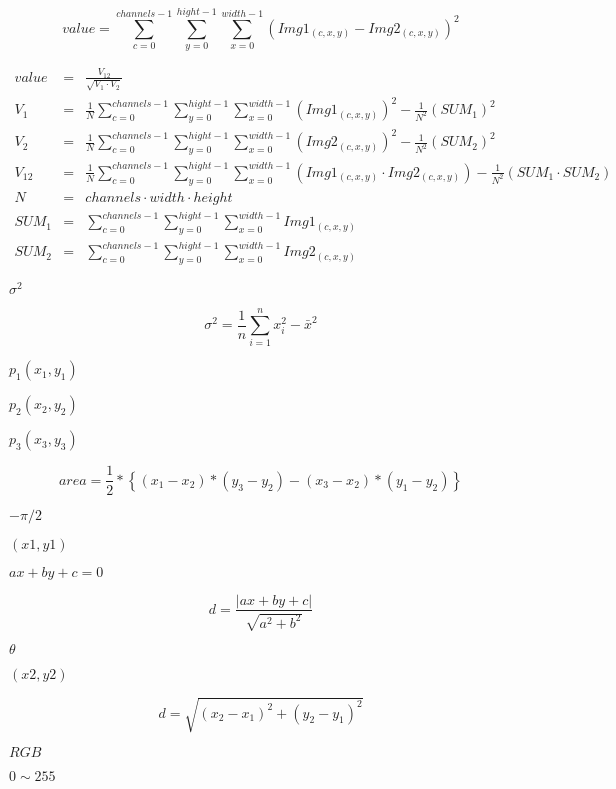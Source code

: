 \documentclass{article}
\begin{document}
\[ value = \sum_{c=0}^{channels-1}\sum_{y=0}^{hight-1}\sum_{x=0}^{width-1}( Img1_{(c,x,y)} - Img2_{(c,x,y)} )^2 \]
\pagebreak

\begin{eqnarray*} value &=& \frac{ V_{12} }{ \sqrt{ V_{1} \cdot V_{2} } }\\ V_{1} &=& \frac{1}{N}\sum_{c=0}^{channels-1}\sum_{y=0}^{hight-1}\sum_{x=0}^{width-1}( Img1_{(c,x,y)} )^2 - \frac{1}{N^2} \left( SUM_{1} \right)^2\\ V_{2} &=& \frac{1}{N}\sum_{c=0}^{channels-1}\sum_{y=0}^{hight-1}\sum_{x=0}^{width-1}( Img2_{(c,x,y)} )^2 - \frac{1}{N^2} \left( SUM_{2} \right)^2\\ V_{12} &=& \frac{1}{N}\sum_{c=0}^{channels-1}\sum_{y=0}^{hight-1}\sum_{x=0}^{width-1}( Img1_{(c,x,y)} \cdot Img2_{(c,x,y)} ) - \frac{1}{N^2} \left( SUM_{1} \cdot SUM_{2} \right)\\ N &=& channels \cdot width \cdot height\\ SUM_{1} &=& \sum_{c=0}^{channels-1}\sum_{y=0}^{hight-1}\sum_{x=0}^{width-1} Img1_{(c,x,y)}\\ SUM_{2} &=& \sum_{c=0}^{channels-1}\sum_{y=0}^{hight-1}\sum_{x=0}^{width-1} Img2_{(c,x,y)} \end{eqnarray*}
\pagebreak

$ \sigma^2 $
\pagebreak

\[ \sigma^2=\frac{1}{n} \sum^{n}_{i=1}x_{i}^{2} - \bar{x}^{2}\]
\pagebreak

$ p_{1} \left( x_{1} , y_{1} \right) $
\pagebreak

$ p_{2} \left( x_{2} , y_{2} \right) $
\pagebreak

$ p_{3} \left( x_{3} , y_{3} \right) $
\pagebreak

\[ area = \frac{1}{2} * \left\{ \left( x_{1} - x_{2} \right) * \left( y_{3} - y_{2} \right) - \left( x_{3} - x_{2} \right) * \left( y_{1} - y_{2} \right) \right\} \]
\pagebreak

$-\pi/2$
\pagebreak

$(x1,y1)$
\pagebreak

$ax+by+c=0$
\pagebreak

\[ d=\frac{|ax+by+c|}{\sqrt{a^2+b^2}} \]
\pagebreak

$ \theta $
\pagebreak

$(x2,y2)$
\pagebreak

\[ d=\sqrt{(x_2-x_1)^2 + (y_2-y_1)^2} \]
\pagebreak

$ RGB $
\pagebreak

$ 0 \sim 255 $
\pagebreak
\end{document}

